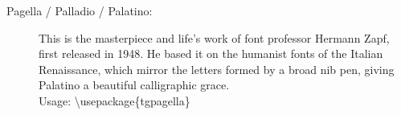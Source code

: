 \documentclass{article}
\begin{document}
\frenchspacing

\begin{description}
\item[Pagella / Palladio / Palatino:]
This is the masterpiece and life's work of font professor Hermann Zapf,
first released in 1948.  He based it on the humanist fonts of the Italian
Renaissance, which mirror the letters formed by a broad nib pen, giving
Palatino a beautiful calligraphic grace.\\
Usage: \textbackslash usepackage\{tgpagella\}
\end{description}
\end{document}
